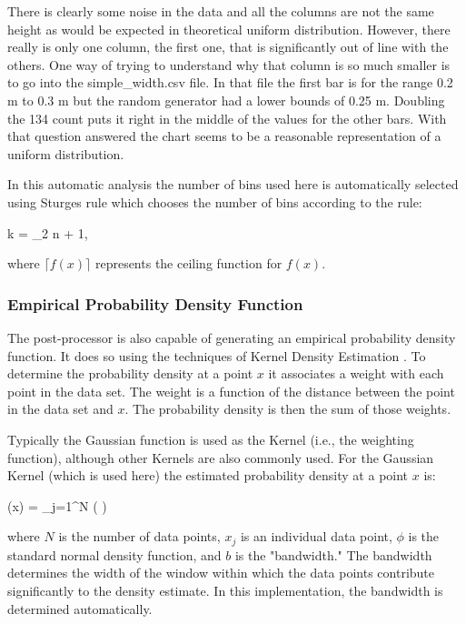 \documentclass[12pt,twoside]{book}
\begin{document}
There is clearly some noise in the data and all the columns are not the same height as would be expected in theoretical uniform distribution. However, there really is only one column, the first one, that is significantly out of line with the others. One way of trying to understand why that column is so much smaller is to go into the {\ct simple\_width.csv} file. In that file the first bar is for the range 0.2 m to 0.3 m but the random generator had a lower bounds of 0.25 m. Doubling the 134 count  puts it right in the middle of the values for the other bars. With that question answered the chart seems to be a reasonable representation of a uniform distribution.

In this automatic analysis the number of bins used here is automatically selected using Sturges rule \cite{Sturges_1926} which chooses the number of bins according to the rule:

\be
k = \lceil \log_2 n \rceil + 1,
\ee

where  $\lceil f(x) \rceil$ represents the ceiling function for $f(x)$.

\subsubsection{Empirical Probability Density Function}

The post-processor is also capable of generating an empirical probability density function. It does so using the techniques of Kernel Density Estimation \cite{Haste_2009}. To determine the probability density at a point $x$ it associates a weight with each point in the data set. The weight is a function of the distance between the point in the data set and $x$. The probability density is then the sum of those weights.

Typically the Gaussian function is used as the Kernel (i.e., the weighting function), although other Kernels are also commonly used. For the Gaussian Kernel (which is used here) the estimated probability density at a point $x$ is:

\be
(x) = \sum_{j=1}^{N} \phi\left( \right)
\ee

where $N$ is the number of data points, $x_j$ is an individual data point, $\phi$ is the standard normal density function, and $b$ is the "bandwidth." The bandwidth determines the width of the window within which the data points contribute significantly to the density estimate. In this implementation, the bandwidth is determined automatically.
\end{document}
